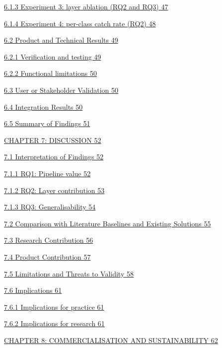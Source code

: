 \documentclass[
]{article}
\begin{document}
\protect\hyperlink{experiment-3-layer-ablation-rq2-and-rq3}{6.1.3
Experiment 3: layer ablation (RQ2 and RQ3) 47}

\protect\hyperlink{experiment-4-per-class-catch-rate-rq2}{6.1.4
Experiment 4: per-class catch rate (RQ2) 48}

\protect\hyperlink{product-and-technical-results}{6.2 Product and
Technical Results 49}

\protect\hyperlink{verification-and-testing}{6.2.1 Verification and
testing 49}

\protect\hyperlink{functional-limitations}{6.2.2 Functional limitations
50}

\protect\hyperlink{user-or-stakeholder-validation}{6.3 User or
Stakeholder Validation 50}

\protect\hyperlink{integration-results}{6.4 Integration Results 50}

\protect\hyperlink{summary-of-findings}{6.5 Summary of Findings 51}

\protect\hyperlink{chapter-7-discussion}{CHAPTER 7: DISCUSSION 52}

\protect\hyperlink{interpretation-of-findings}{7.1 Interpretation of
Findings 52}

\protect\hyperlink{rq1-pipeline-value}{7.1.1 RQ1: Pipeline value 52}

\protect\hyperlink{rq2-layer-contribution}{7.1.2 RQ2: Layer contribution
53}

\protect\hyperlink{rq3-generalisability}{7.1.3 RQ3: Generalisability 54}

\protect\hyperlink{comparison-with-literature-baselines-and-existing-solutions}{7.2
Comparison with Literature Baselines and Existing Solutions 55}

\protect\hyperlink{research-contribution}{7.3 Research Contribution 56}

\protect\hyperlink{product-contribution}{7.4 Product Contribution 57}

\protect\hyperlink{limitations-and-threats-to-validity}{7.5 Limitations
and Threats to Validity 58}

\protect\hyperlink{implications}{7.6 Implications 61}

\protect\hyperlink{implications-for-practice}{7.6.1 Implications for
practice 61}

\protect\hyperlink{implications-for-research}{7.6.2 Implications for
research 61}

\protect\hyperlink{chapter-8-commercialisation-and-sustainability}{CHAPTER
8: COMMERCIALISATION AND SUSTAINABILITY 62}
\end{document}
